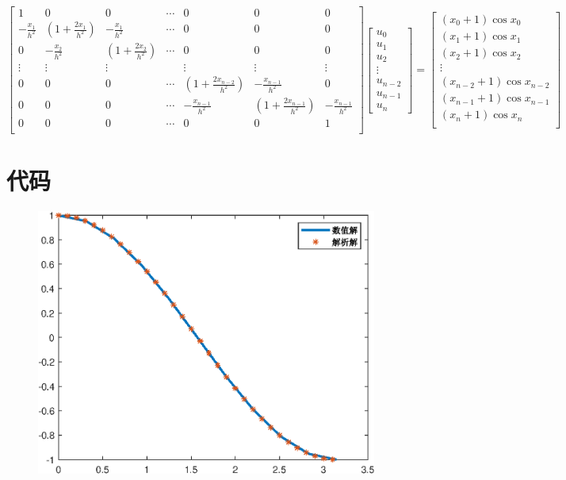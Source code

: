 \documentclass{ctexart}
\numberwithin{equation}{section}    %
\begin{document}
\begin{equation}
    \begin{bmatrix}
        1&0&0&\cdots&0&0&0\\
        -\frac{x_1}{h^2}&(1+\frac{2x_1}{h^2})&-\frac{x_1}{h^2}&\cdots&0&0&0\\
        0&-\frac{x_2}{h^2}&(1+\frac{2x_2}{h^2})&\cdots&0&0&0\\
        \vdots  & \vdots  & \vdots & &\vdots &\vdots & \vdots\\
        0&0&0&\cdots&(1+\frac{2x_{n-2}}{h^2})&-\frac{x_{n-1}}{h^2}&0\\
        0&0&0&\cdots&-\frac{x_{n-1}}{h^2}&(1+\frac{2x_{n-1}}{h^2})&-\frac{x_{n-1}}{h^2}\\
        0&0&0&\cdots&0&0&1\\
    \end{bmatrix}
    \begin{bmatrix}
        u_0\\
        u_1\\
        u_2\\
        \vdots\\
        u_{n-2}\\
        u_{n-1}\\
        u_n
    \end{bmatrix}
    =
    \begin{bmatrix}
        (x_0+1)\cos x_0\\
        (x_1+1)\cos x_1\\
        (x_2+1)\cos x_2\\
        \vdots\\
        (x_{n-2}+1)\cos x_{n-2}\\
        (x_{n-1}+1)\cos x_{n-1}\\
        (x_n+1)\cos x_n\\
    \end{bmatrix}
\end{equation}
\section{代码}

\begin{figure}[htp]
    \centering
    \includegraphics[width=0.7\linewidth]{fig/pic.eps}
\end{figure}
\end{document}
